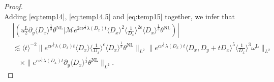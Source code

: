 \documentclass[reqno, 12pt]{amsart} %
\theoremstyle{plain} %
\theoremstyle{definition}
\theoremstyle{remark}
\numberwithin{equation}{section} %
\newcommand{\py}{\partial_y}
\begin{document}
\begin{proof}
\begin{equation}
		\end{equation}
		Adding \eqref{eq:temp14}, \eqref{eq:temp14.5} and \eqref{eq:temp15} together, we infer that
		\begin{equation}\begin{aligned} \label{eq:temp15.5}
				&\left|\left(  u_2^{\mathrm{L}} \py \langle D_x \rangle^\frac13 \theta^{\mathrm{NL}} \big| \mathcal{M} e^{2 c \nu^{\frac{1}{3}} \lambda\left(D_x\right) t}\langle D_x\rangle^2\langle\frac{1}{D_x}\rangle^{2 \epsilon} \langle D_x \rangle^\frac13 \theta^{\mathrm{NL}}\right)\right|\\
				&\lesssim \langle t\rangle^{-2} \|e^{c \nu^{\frac{1}{3}} \lambda\left(D_x\right) t}\langle D_x\rangle  \langle \frac{1}{D_x}\rangle^\epsilon \langle D_x \rangle^\frac13  \theta^{\mathrm{NL}}\|_{L^2}    \|e^{c \nu^{\frac{1}{3}} \lambda\left(D_x\right) t}\langle D_x, D_y + tD_x\rangle^ 5 \langle\frac{1}{D_x}\rangle^3 \omega^{\mathrm{L}} \|_{L^2} \\
				&\quad \times \|e^{c \nu^{\frac{1}{3}} \lambda\left(D_x\right) t} \py \langle D_x \rangle^\frac13  \theta^{\mathrm{NL}} \|_{L^2}.
		\end{aligned}\end{equation}
		

\end{proof}
\end{document}
